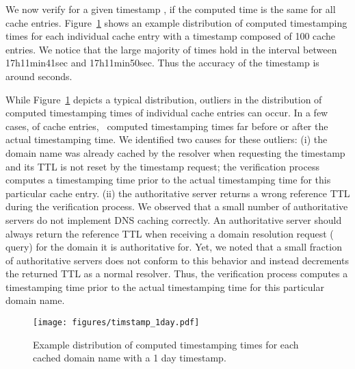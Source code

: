 We now verify for a given timestamp , if the computed time  is the same for all cache entries. Figure~\ref{fig:timestamp1day} shows an example distribution of computed timestamping times for each individual cache entry with a timestamp composed of 100 cache entries. We notice that the large majority of times hold in the interval between 17h11min41sec and 17h11min50sec. Thus the accuracy of the timestamp is around  seconds. 

While Figure~\ref{fig:timestamp1day} depicts a typical distribution, outliers in the distribution of computed  timestamping times of individual cache entries can occur. 
In a few cases,  of cache entries, \DNStamp\ computed timestamping times far before or after the actual timestamping time. 
We identified two causes for these outliers: 
(i) the domain name was already cached by the resolver when requesting the timestamp and its TTL is not reset by the timestamp request; the verification process computes a timestamping time prior to the actual timestamping time for this particular cache entry.
(ii) the authoritative server returns a wrong reference TTL during the verification process. 
We observed that a small number of authoritative servers do not implement DNS caching correctly. An authoritative server should always return the reference TTL when receiving a domain resolution request ( query) for the domain it is authoritative for. Yet, we noted that a small fraction of authoritative servers does not conform to this behavior and instead decrements the returned TTL as a normal resolver. Thus, the verification process computes a timestamping time prior to the actual timestamping time for this particular domain name.

\begin{figure}
\begin{center}
\texttt{[image: figures/timstamp\_1day.pdf]}
\caption{Example distribution of computed timestamping times for each cached domain name with a 1 day timestamp.}
\label{fig:timestamp1day}
\end{center}
\end{figure}

